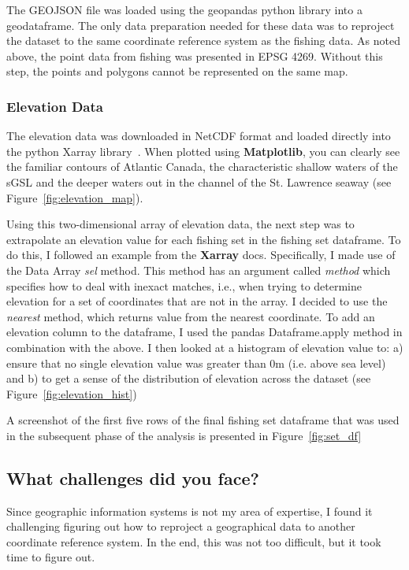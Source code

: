The GEOJSON file was loaded using the geopandas python library into a geodataframe.
The only data preparation needed for these data was to reproject the dataset to the same coordinate reference system as the fishing data.
As noted above, the point data from fishing was presented in EPSG 4269.
Without this step, the points and polygons cannot be represented on the same map.

\subsubsection{Elevation Data}

The elevation data was downloaded in NetCDF format and loaded directly into the python Xarray library~\cite{xarray}.
When plotted using \textbf{Matplotlib}, you can clearly see the familiar contours of Atlantic Canada, the characteristic
shallow waters of the sGSL and the deeper waters out in the channel of the St. Lawrence seaway (see Figure~\ref{fig:elevation_map}).

Using this two-dimensional array of elevation data, the next step was to extrapolate an elevation value for each fishing set in the fishing set dataframe.
To do this, I followed an example from the \textbf{Xarray} docs.
Specifically, I made use of the Data Array \textit{sel} method.
This method has an argument called \textit{method} which specifies how to deal with inexact matches, i.e.,
when trying to determine elevation for a set of coordinates that are not in the array. I decided to use the \textit{nearest} method,
which returns value from the nearest coordinate.
To add an elevation column to the dataframe, I used the pandas Dataframe.apply method in combination with the above.
I then looked at a histogram of elevation value to: a) ensure that no single elevation value was greater than 0m (i.e. above sea level)
and b) to get a sense of the distribution of elevation across the dataset (see Figure~\ref{fig:elevation_hist})

A screenshot of the first five rows of the final fishing set dataframe that was used in the subsequent phase of the analysis is presented in
Figure~\ref{fig:set_df}

\subsection{What challenges did you face?}

Since geographic information systems is not my area of expertise, I found it challenging figuring out how to reproject a geographical data to another
coordinate reference system.
In the end, this was not too difficult, but it took time to figure out.

